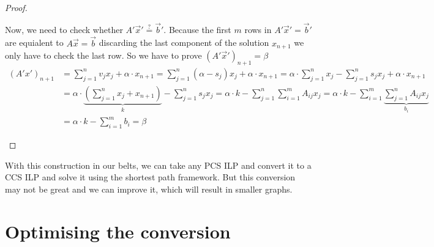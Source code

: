 \begin{proof}
\begin{itemize}
        Now, we need to check whether $A'\vec x'\stackrel{?}{=}\vec b'$. Because the first $m$ rows in $A'\vec x'=\vec b'$ are equialent to $A\vec x=\vec b$ discarding the last component of the solution $x_{n+1}$ we only have to check the last row. So we have to prove $(A'\vec x')_{n+1} = \beta$
        \begin{align*}
            (A'x')_{n+1} &= \sum_{j=1}^{n}v_jx_j + \alpha \cdot x_{n+1} = \sum_{j=1}^{n}(\alpha - s_j)x_j + \alpha \cdot x_{n+1} = \alpha \cdot \sum_{j=1}^{n}x_j - \sum_{j=1}^{n}s_jx_j + \alpha \cdot x_{n+1}\\
            &= \alpha \cdot \underbrace{\left(\sum_{j=1}^{n}x_j + x_{n+1}\right)}_k - \sum_{j=1}^{n}s_jx_j = \alpha \cdot k - \sum_{j=1}^{n}\sum_{i=1}^{m}A_{ij}x_j = \alpha\cdot k - \sum_{i=1}^{m}\underbrace{\sum_{j=1}^{n}A_{ij}x_j}_{b_i}\\
            &= \alpha\cdot k - \sum_{i=1}^{m}b_i = \beta
        \end{align*}
    \end{itemize}
\end{proof}
With this construction in our belts, we can take any PCS ILP and convert it to a CCS ILP and solve it using the shortest path framework. But this conversion may not be great and we can improve it, which will result in smaller graphs.

\section{Optimising the conversion}
